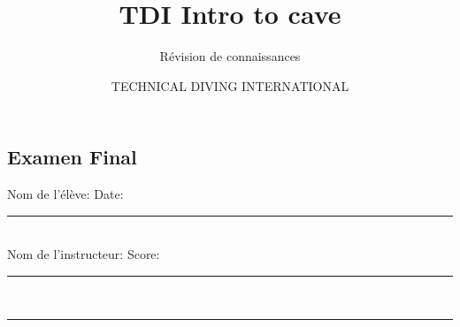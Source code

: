\documentclass[english,10pt,a4paper]{article}
\title{TDI Intro to cave}
\subtitle{Révision de connaissances}
\author{TECHNICAL DIVING INTERNATIONAL}
\begin{document}
	


	\begin{center}
		\section*{Examen Final}
	\end{center}

	\begin{bfseries}
		Nom de l'élève: \hrulefill \hspace{1cm} Date: \rule{2cm}{0.4pt} \vspace{0.5cm} \\
		Nom de l'instructeur:\hrulefill \hspace{1cm} Score: \rule{2cm}{0.4pt}\\
		
	\end{bfseries}
	\rule{\textwidth}{1pt}
	\vspace{1cm}	
\end{document}
